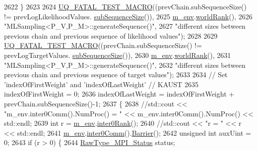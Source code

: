 \begin{DoxyCode}
2622       \}
2623 
2624       \hyperlink{_defines_8h_a56d63d18d0a6d45757de47fcc06f574d}{UQ\_FATAL\_TEST\_MACRO}((prevChain.subSequenceSize() != prevLogLikelihoodValues.
      \hyperlink{class_q_u_e_s_o_1_1_scalar_sequence_a0288ea295eedc216a1617b3286f6f3a0}{subSequenceSize}()),
2625                           \hyperlink{class_q_u_e_s_o_1_1_m_l_sampling_a13f1ca4fe9f94822fe572a743eaced1d}{m\_env}.\hyperlink{class_q_u_e_s_o_1_1_base_environment_a78b57112bbd0e6dd0e8afec00b40ffa7}{worldRank}(),
2626                           \textcolor{stringliteral}{"MLSampling<P\_V,P\_M>::generateSequence()"},
2627                           \textcolor{stringliteral}{"different sizes between previous chain and previous sequence of likelihood
       values"});
2628 
2629       \hyperlink{_defines_8h_a56d63d18d0a6d45757de47fcc06f574d}{UQ\_FATAL\_TEST\_MACRO}((prevChain.subSequenceSize() != prevLogTargetValues.
      \hyperlink{class_q_u_e_s_o_1_1_scalar_sequence_a0288ea295eedc216a1617b3286f6f3a0}{subSequenceSize}()),
2630                           \hyperlink{class_q_u_e_s_o_1_1_m_l_sampling_a13f1ca4fe9f94822fe572a743eaced1d}{m\_env}.\hyperlink{class_q_u_e_s_o_1_1_base_environment_a78b57112bbd0e6dd0e8afec00b40ffa7}{worldRank}(),
2631                           \textcolor{stringliteral}{"MLSampling<P\_V,P\_M>::generateSequence()"},
2632                           \textcolor{stringliteral}{"different sizes between previous chain and previous sequence of target values"});
2633 
2634       \textcolor{comment}{// Set 'indexOfFirstWeight' and 'indexOfLastWeight' // KAUST}
2635       indexOfFirstWeight = 0;
2636       indexOfLastWeight  = indexOfFirstWeight + prevChain.subSequenceSize()-1;
2637       \{
2638         \textcolor{comment}{//std::cout << "m\_env.inter0Comm().NumProc() = " << m\_env.inter0Comm().NumProc() << std::endl;}
2639         \textcolor{keywordtype}{int} r = \hyperlink{class_q_u_e_s_o_1_1_m_l_sampling_a13f1ca4fe9f94822fe572a743eaced1d}{m\_env}.\hyperlink{class_q_u_e_s_o_1_1_base_environment_ae106b5bb8a80b655b88b3a26b1e7c185}{inter0Rank}();
2640         \textcolor{comment}{//std::cout << "r = " << r << std::endl;}
2641         \hyperlink{class_q_u_e_s_o_1_1_m_l_sampling_a13f1ca4fe9f94822fe572a743eaced1d}{m\_env}.\hyperlink{class_q_u_e_s_o_1_1_base_environment_a689e4d140c74d495d97eb498714a4b82}{inter0Comm}().\hyperlink{class_q_u_e_s_o_1_1_mpi_comm_a4059971c30e023b272fccaa6aa00c426}{Barrier}();
2642         \textcolor{keywordtype}{unsigned} \textcolor{keywordtype}{int} auxUint = 0;
2643         \textcolor{keywordflow}{if} (r > 0) \{
2644           \hyperlink{namespace_q_u_e_s_o_af3c313103c6396188748a1d534577ff7}{RawType\_MPI\_Status} status;

\end{DoxyCode}
